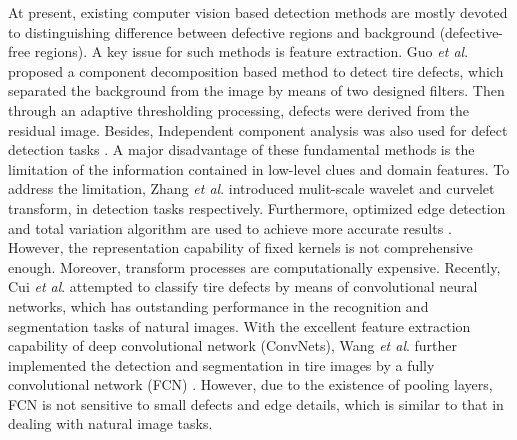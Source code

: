 \documentclass{article}
\begin{document}
At present, existing computer vision based detection methods are mostly devoted to distinguishing difference between defective regions and background (defective-free regions). A key issue for such methods is feature extraction. Guo {\it et al}. \cite{guo2012tire} proposed a component decomposition based method to detect tire defects, which separated the background from the image by means of two designed filters. Then through an adaptive thresholding processing, defects were derived from the residual image. Besides, Independent component analysis was also used for defect detection tasks \cite{cui2016defect,cui2016novel}. A major disadvantage of these fundamental methods is the limitation of the information contained in low-level clues and domain features. To address the limitation, Zhang {\it et al}. \cite{zhang2013defect,zhang2015automatic} introduced mulit-scale wavelet and curvelet transform, in detection tasks respectively. Furthermore, optimized edge detection and total variation algorithm are used to achieve more accurate results \cite{yan2013detection}. However, the representation capability of fixed kernels is not comprehensive enough. Moreover, transform processes are computationally expensive. Recently, Cui {\it et al}. \cite{cui2018tire} attempted to classify tire defects by means of convolutional neural networks, which has outstanding performance in the recognition and segmentation tasks of natural images. With the excellent feature extraction capability of deep convolutional network (ConvNets), Wang {\it et al}. \cite{wang2019tire} further implemented the detection and segmentation in tire images by a fully convolutional network (FCN) \cite{long2015fully}. However, due to the existence of pooling layers, FCN is not sensitive to small defects and edge details, which is similar to that in dealing with natural image tasks.
\end{document}
